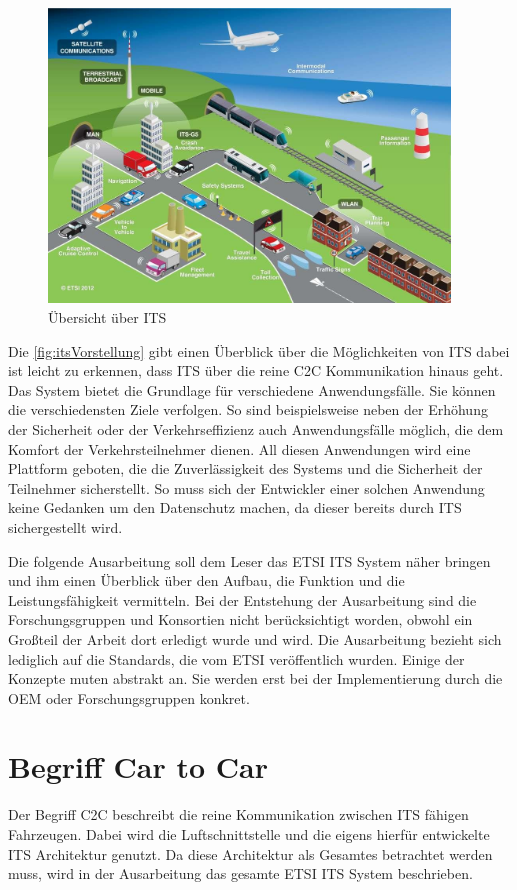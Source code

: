 \begin{figure}[h]
	\includegraphics[width=0.95\textwidth]{content/images/00_einleitung/ETSI_ITS_09_2012.jpg}
	\caption{Übersicht über ITS \cite{ITS_vorstellung}}
	\label{fig:itsVorstellung}
\end{figure}

Die \autoref{fig:itsVorstellung} gibt einen Überblick über die Möglichkeiten von \ac{ITS} dabei ist leicht zu erkennen, dass \ac{ITS} über die reine \ac{C2C} Kommunikation hinaus geht. Das System bietet die Grundlage für verschiedene Anwendungsfälle. Sie können die verschiedensten Ziele verfolgen. So sind beispielsweise neben der Erhöhung der Sicherheit oder der Verkehrseffizienz auch Anwendungsfälle möglich, die dem Komfort der Verkehrsteilnehmer dienen. All diesen Anwendungen wird eine Plattform geboten, die die Zuverlässigkeit des Systems und die Sicherheit der Teilnehmer sicherstellt. So muss sich der Entwickler einer solchen Anwendung keine Gedanken um den Datenschutz machen, da dieser bereits durch \ac{ITS} sichergestellt wird.

Die folgende Ausarbeitung soll dem Leser das \ac{ETSI} \ac{ITS} System näher bringen und ihm einen Überblick über den Aufbau, die Funktion und die Leistungsfähigkeit vermitteln. Bei der Entstehung der Ausarbeitung sind die Forschungsgruppen und Konsortien nicht berücksichtigt worden, obwohl ein Großteil der Arbeit dort erledigt wurde und wird. Die Ausarbeitung bezieht sich lediglich auf die Standards, die vom \ac{ETSI} veröffentlich wurden. Einige der Konzepte muten abstrakt an. Sie werden erst bei der Implementierung durch die \ac{OEM} oder Forschungsgruppen konkret.

\section{Begriff Car to Car}
Der Begriff \ac{C2C} beschreibt die reine Kommunikation zwischen \ac{ITS} fähigen Fahrzeugen. Dabei wird die Luftschnittstelle und die eigens hierfür entwickelte \ac{ITS} Architektur genutzt. Da diese Architektur als Gesamtes betrachtet werden muss, wird in der Ausarbeitung das gesamte \ac{ETSI} \ac{ITS} System beschrieben.  

